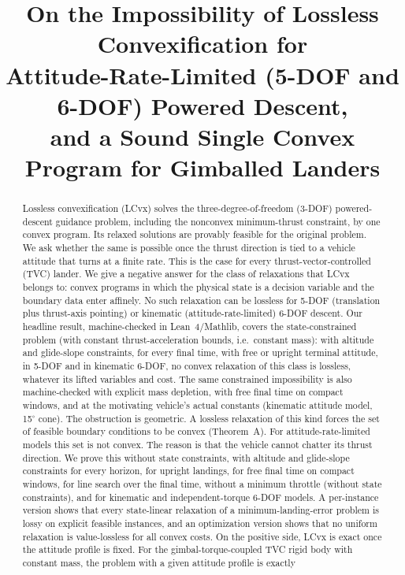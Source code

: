 \documentclass[11pt]{article}
\title{On the Impossibility of Lossless Convexification for\\
Attitude-Rate-Limited (5-DOF and 6-DOF) Powered Descent,\\
and a Sound Single Convex Program for Gimballed Landers}
\author{\intshare{\paperauthors\thanks{Author names to be filled in.}}{\paperauthors}}
\date{\intshare{Draft of 11 November 2026 (revision 8)}{11 November 2026}}
\theoremstyle{plain}
\theoremstyle{definition}
\theoremstyle{remark}
\begin{document}
\maketitle

\begin{abstract}
Lossless convexification (LCvx) solves the three-degree-of-freedom (3-DOF) powered-descent guidance problem,
including the nonconvex minimum-thrust constraint, by one convex program. Its relaxed solutions are provably
feasible for the original problem. We ask whether the same is possible once the thrust direction is tied to a
vehicle attitude that turns at a finite rate. This is the case for every thrust-vector-controlled (TVC) lander.
We give a negative answer for the class of relaxations that LCvx belongs to: convex programs in which the physical
state is a decision variable and the boundary data enter affinely. No such relaxation can be lossless for 5-DOF
(translation plus thrust-axis pointing) or kinematic (attitude-rate-limited) 6-DOF descent. Our headline result, machine-checked in Lean~4/Mathlib,
covers the state-constrained problem (with constant thrust-acceleration bounds, i.e.\ constant mass): with altitude and glide-slope constraints, for every final time, with free or upright
terminal attitude, in 5-DOF and in kinematic 6-DOF, no convex relaxation of this class is lossless, whatever its lifted variables
and cost. The same constrained impossibility is also machine-checked with explicit mass depletion, with free final time on
compact windows, and at the motivating vehicle's actual constants (kinematic attitude model, 15$^\circ$ cone). The obstruction is
geometric. A lossless
relaxation of this kind forces the set of feasible boundary conditions to be convex (Theorem~A). For attitude-rate-limited
models this set is not convex. The reason is that the vehicle cannot chatter its thrust direction. We prove this
without state constraints, with altitude and glide-slope constraints for every horizon, for upright landings, for
free final time on compact windows, for line search over the final time, without a minimum throttle (without state constraints),
and for kinematic and independent-torque 6-DOF models. A per-instance version shows that every state-linear relaxation of a
minimum-landing-error problem is lossy on explicit feasible instances, and an optimization version shows that no
uniform relaxation is value-lossless for all convex costs. On the positive side, LCvx is exact once the attitude
profile is fixed. For the gimbal-torque-coupled TVC rigid body with constant mass, the problem with a given attitude profile is exactly

\end{abstract}
\end{document}

